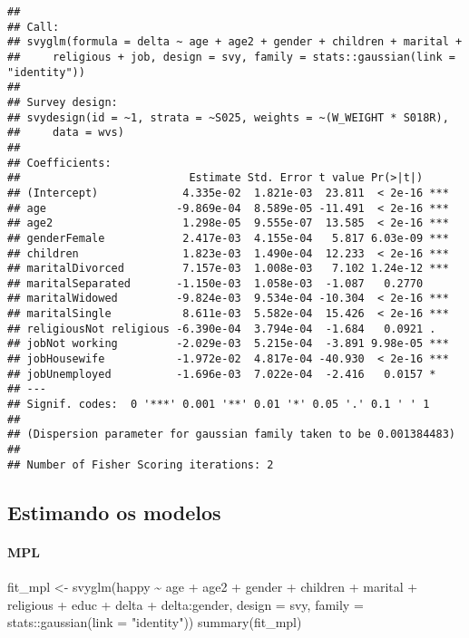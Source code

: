 \documentclass[
]{article}
\newenvironment{Shaded}{\begin{snugshade}}{\end{snugshade}}
\newcommand{\AttributeTok}[1]{\textcolor[rgb]{0.77,0.63,0.00}{#1}}
\newcommand{\FunctionTok}[1]{\textcolor[rgb]{0.00,0.00,0.00}{#1}}
\newcommand{\NormalTok}[1]{#1}
\newcommand{\OtherTok}[1]{\textcolor[rgb]{0.56,0.35,0.01}{#1}}
\newcommand{\SpecialCharTok}[1]{\textcolor[rgb]{0.00,0.00,0.00}{#1}}
\newcommand{\StringTok}[1]{\textcolor[rgb]{0.31,0.60,0.02}{#1}}
\begin{document}
\begin{verbatim}
## 
## Call:
## svyglm(formula = delta ~ age + age2 + gender + children + marital + 
##     religious + job, design = svy, family = stats::gaussian(link = "identity"))
## 
## Survey design:
## svydesign(id = ~1, strata = ~S025, weights = ~(W_WEIGHT * S018R), 
##     data = wvs)
## 
## Coefficients:
##                          Estimate Std. Error t value Pr(>|t|)    
## (Intercept)             4.335e-02  1.821e-03  23.811  < 2e-16 ***
## age                    -9.869e-04  8.589e-05 -11.491  < 2e-16 ***
## age2                    1.298e-05  9.555e-07  13.585  < 2e-16 ***
## genderFemale            2.417e-03  4.155e-04   5.817 6.03e-09 ***
## children                1.823e-03  1.490e-04  12.233  < 2e-16 ***
## maritalDivorced         7.157e-03  1.008e-03   7.102 1.24e-12 ***
## maritalSeparated       -1.150e-03  1.058e-03  -1.087   0.2770    
## maritalWidowed         -9.824e-03  9.534e-04 -10.304  < 2e-16 ***
## maritalSingle           8.611e-03  5.582e-04  15.426  < 2e-16 ***
## religiousNot religious -6.390e-04  3.794e-04  -1.684   0.0921 .  
## jobNot working         -2.029e-03  5.215e-04  -3.891 9.98e-05 ***
## jobHousewife           -1.972e-02  4.817e-04 -40.930  < 2e-16 ***
## jobUnemployed          -1.696e-03  7.022e-04  -2.416   0.0157 *  
## ---
## Signif. codes:  0 '***' 0.001 '**' 0.01 '*' 0.05 '.' 0.1 ' ' 1
## 
## (Dispersion parameter for gaussian family taken to be 0.001384483)
## 
## Number of Fisher Scoring iterations: 2
\end{verbatim}

\hypertarget{estimando-os-modelos}{%
\subsection{Estimando os modelos}\label{estimando-os-modelos}}

\hypertarget{mpl}{%
\paragraph{MPL}\label{mpl}}

\begin{Shaded}
\begin{Highlighting}[]
\NormalTok{fit\_mpl }\OtherTok{\textless{}{-}} \FunctionTok{svyglm}\NormalTok{(happy }\SpecialCharTok{\textasciitilde{}}\NormalTok{ age }\SpecialCharTok{+}\NormalTok{ age2 }\SpecialCharTok{+}\NormalTok{ gender }\SpecialCharTok{+}\NormalTok{ children }\SpecialCharTok{+}\NormalTok{ marital }\SpecialCharTok{+}\NormalTok{ religious }\SpecialCharTok{+}\NormalTok{ educ }\SpecialCharTok{+}
\NormalTok{                    delta }\SpecialCharTok{+}\NormalTok{ delta}\SpecialCharTok{:}\NormalTok{gender,}
                  \AttributeTok{design =}\NormalTok{ svy,}
                  \AttributeTok{family =}\NormalTok{ stats}\SpecialCharTok{::}\FunctionTok{gaussian}\NormalTok{(}\AttributeTok{link =} \StringTok{"identity"}\NormalTok{))}
\FunctionTok{summary}\NormalTok{(fit\_mpl)}
\end{Highlighting}
\end{Shaded}
\end{document}
